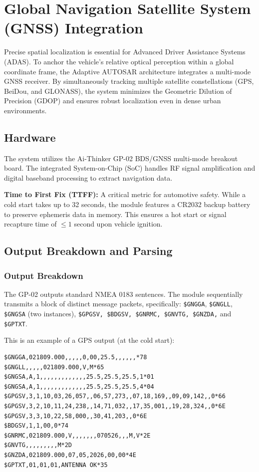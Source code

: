 \section{Global Navigation Satellite System (GNSS) Integration}

Precise spatial localization is essential for Advanced Driver Assistance Systems (ADAS). To anchor the vehicle's relative optical perception within a global coordinate frame, the Adaptive AUTOSAR architecture integrates a multi-mode GNSS receiver. By simultaneously tracking multiple satellite constellations (GPS, BeiDou, and GLONASS), the system minimizes the Geometric Dilution of Precision (GDOP) and ensures robust localization even in dense urban environments.

\subsection{Hardware}

The system utilizes the Ai-Thinker GP-02 BDS/GNSS multi-mode breakout board. The integrated System-on-Chip (SoC) handles RF signal amplification and digital baseband processing to extract navigation data.


\textbf{Time to First Fix (TTFF):} A critical metric for automotive safety. While a cold start takes up to 32 seconds, the module features a CR2032 backup battery to preserve ephemeris data in memory. This ensures a hot start or signal recapture time of $\leq 1$ second upon vehicle ignition.

\subsection{Output Breakdown and Parsing}
\subsubsection{Output Breakdown}
The GP-02 outputs standard NMEA 0183 sentences. The module sequentially transmits a block of distinct message packets, specifically: \texttt{\$GNGGA}, \texttt{\$GNGLL}, \texttt{\$GNGSA} (two instances), \texttt{\$GPGSV, \$BDGSV, \$GNRMC, \$GNVTG, \$GNZDA,} and \texttt{\$GPTXT}.

This is an example of a GPS output (at the cold start): 

\begin{lstlisting}
$GNGGA,021809.000,,,,,0,00,25.5,,,,,,*78
$GNGLL,,,,,021809.000,V,M*65
$GNGSA,A,1,,,,,,,,,,,,,25.5,25.5,25.5,1*01
$GNGSA,A,1,,,,,,,,,,,,,25.5,25.5,25.5,4*04
$GPGSV,3,1,10,03,26,057,,06,57,273,,07,18,169,,09,09,142,,0*66
$GPGSV,3,2,10,11,24,238,,14,71,032,,17,35,001,,19,28,324,,0*6E
$GPGSV,3,3,10,22,58,000,,30,41,203,,0*6E
$BDGSV,1,1,00,0*74
$GNRMC,021809.000,V,,,,,,,070526,,,M,V*2E
$GNVTG,,,,,,,,,M*2D
$GNZDA,021809.000,07,05,2026,00,00*4E
$GPTXT,01,01,01,ANTENNA OK*35
\end{lstlisting}

